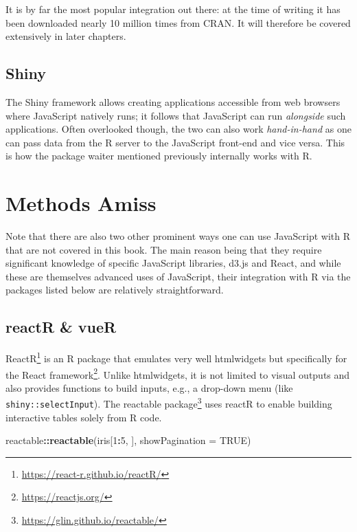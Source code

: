 \documentclass[
]{krantz}
\makeatletter
\newenvironment{Shaded}{\begin{snugshade}}{\end{snugshade}}
\newcommand{\DataTypeTok}[1]{\textcolor[rgb]{0.27,0.27,0.27}{#1}}
\newcommand{\DecValTok}[1]{\textcolor[rgb]{0.06,0.06,0.06}{#1}}
\newcommand{\KeywordTok}[1]{\textcolor[rgb]{0.27,0.27,0.27}{\textbf{#1}}}
\newcommand{\NormalTok}[1]{#1}
\newcommand{\OperatorTok}[1]{\textcolor[rgb]{0.43,0.43,0.43}{\textbf{#1}}}
\newcommand{\OtherTok}[1]{\textcolor[rgb]{0.37,0.37,0.37}{#1}}
\renewcommand{\href}[2]{#2\footnote{\url{#1}}}
\newenvironment{kframe}{%
\medskip{}
\setlength{\fboxsep}{.8em}
 \def\at@end@of@kframe{}%
 \ifinner\ifhmode%
  \def\at@end@of@kframe{\end{minipage}}%
  \begin{minipage}{\columnwidth}%
 \fi\fi%
 \def\FrameCommand##1{\hskip\@totalleftmargin \hskip-\fboxsep
 \colorbox{shadecolor}{##1}\hskip-\fboxsep
     \hskip-\linewidth \hskip-\@totalleftmargin \hskip\columnwidth}%
 \MakeFramed {\advance\hsize-\width
   \@totalleftmargin\z@ \linewidth\hsize
   \@setminipage}}%
 {\par\unskip\endMakeFramed%
 \at@end@of@kframe}
\renewenvironment{Shaded}{\begin{kframe}}{\end{kframe}}
\makeatother
\begin{document}
It is by far the most popular integration out there: at the time of writing it has been downloaded nearly 10 million times from CRAN. It will therefore be covered extensively in later chapters.

\hypertarget{intro-shiny}{%
\subsection{Shiny}\label{intro-shiny}}

The Shiny framework allows creating applications accessible from web browsers where JavaScript natively runs; it follows that JavaScript can run \emph{alongside} such applications. Often overlooked though, the two can also work \emph{hand-in-hand} as one can pass data from the R server to the JavaScript front-end and vice versa. This is how the package waiter mentioned previously internally works with R.

\hypertarget{intro-amiss}{%
\section{Methods Amiss}\label{intro-amiss}}

Note that there are also two other prominent ways one can use JavaScript with R that are not covered in this book. The main reason being that they require significant knowledge of specific JavaScript libraries, d3.js and React, and while these are themselves advanced uses of JavaScript, their integration with R via the packages listed below are relatively straightforward.

\hypertarget{intro-reactr-vuer}{%
\subsection{reactR \& vueR}\label{intro-reactr-vuer}}

\href{https://react-r.github.io/reactR/}{ReactR} \citep{R-reactR} is an R package that emulates very well htmlwidgets but specifically for the \href{https://reactjs.org/}{React framework}. Unlike htmlwidgets, it is not limited to visual outputs and also provides functions to build inputs, e.g., a drop-down menu (like \texttt{shiny::selectInput}). The \href{https://glin.github.io/reactable/}{reactable package} \citep{R-reactable} uses reactR to enable building interactive tables solely from R code.

\begin{Shaded}
\begin{Highlighting}[]
\NormalTok{reactable}\OperatorTok{::}\KeywordTok{reactable}\NormalTok{(iris[}\DecValTok{1}\OperatorTok{:}\DecValTok{5}\NormalTok{, ], }\DataTypeTok{showPagination =} \OtherTok{TRUE}\NormalTok{)}
\end{Highlighting}
\end{Shaded}
\end{document}
